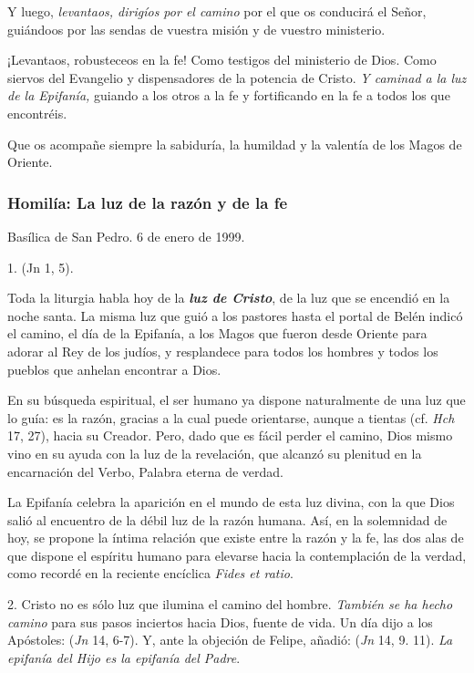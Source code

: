 Y luego, \emph{levantaos, dirigíos por el camino} por el que os conducirá el Señor, guiándoos por las sendas de vuestra misión y de vuestro ministerio.

¡Levantaos, robusteceos en la fe! Como testigos del ministerio de Dios. Como siervos del Evangelio y dispensadores de la potencia de Cristo. \emph{Y caminad a la luz de la Epifanía,} guiando a los otros a la fe y fortificando en la fe a todos los que encontréis.

Que os acompañe siempre la sabiduría, la humildad y la valentía de los Magos de Oriente.

\subsubsection{Homilía: La luz de la razón y de la fe}

Basílica de San Pedro. 6 de enero de 1999.

1.  (Jn 1, 5).

Toda la liturgia habla hoy de la \emph{\textbf{luz de Cristo}}, de la luz que se encendió en la noche santa. La misma luz que guió a los pastores hasta el portal de Belén indicó el camino, el día de la Epifanía, a los Magos que fueron desde Oriente para adorar al Rey de los judíos, y resplandece para todos los hombres y todos los pueblos que anhelan encontrar a Dios.

En su búsqueda espiritual, el ser humano ya dispone naturalmente de una luz que lo guía: es la razón, gracias a la cual puede orientarse, aunque a tientas (cf. \emph{Hch} 17, 27), hacia su Creador. Pero, dado que es fácil perder el camino, Dios mismo vino en su ayuda con la luz de la revelación, que alcanzó su plenitud en la encarnación del Verbo, Palabra eterna de verdad.

La Epifanía celebra la aparición en el mundo de esta luz divina, con la que Dios salió al encuentro de la débil luz de la razón humana. Así, en la solemnidad de hoy, se propone la íntima relación que existe entre la razón y la fe, las dos alas de que dispone el espíritu humano para elevarse hacia la contemplación de la verdad, como recordé en la reciente encíclica \emph{Fides et ratio}.

2. Cristo no es sólo luz que ilumina el camino del hombre. \emph{También se ha hecho camino} para sus pasos inciertos hacia Dios, fuente de vida. Un día dijo a los Apóstoles:  (\emph{Jn} 14, 6-7). Y, ante la objeción de Felipe, añadió:  (\emph{Jn} 14, 9. 11). \emph{La epifanía del Hijo es la epifanía del Padre}.

